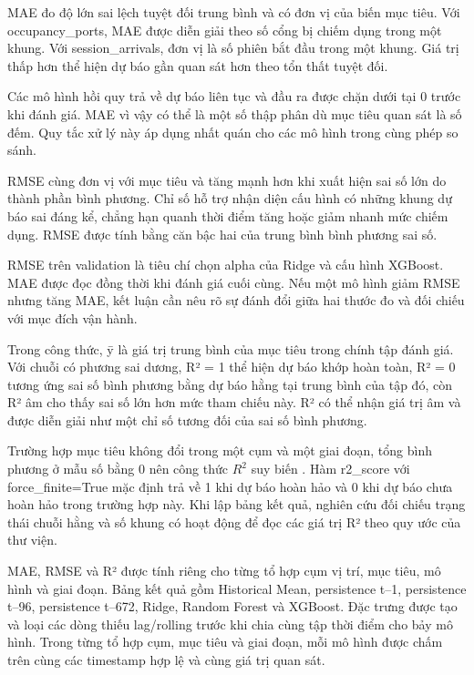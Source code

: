 \documentclass[conference,a4paper]{IEEEtran}
\begin{document}
MAE đo độ lớn sai lệch tuyệt đối trung bình và có đơn vị của biến mục tiêu. Với occupancy\_ports, MAE được diễn giải theo số cổng bị chiếm dụng trong một khung. Với session\_arrivals, đơn vị là số phiên bắt đầu trong một khung. Giá trị thấp hơn thể hiện dự báo gần quan sát hơn theo tổn thất tuyệt đối.

Các mô hình hồi quy trả về dự báo liên tục và đầu ra được chặn dưới tại 0 trước khi đánh giá. MAE vì vậy có thể là một số thập phân dù mục tiêu quan sát là số đếm. Quy tắc xử lý này áp dụng nhất quán cho các mô hình trong cùng phép so sánh.

RMSE cùng đơn vị với mục tiêu và tăng mạnh hơn khi xuất hiện sai số lớn do thành phần bình phương. Chỉ số hỗ trợ nhận diện cấu hình có những khung dự báo sai đáng kể, chẳng hạn quanh thời điểm tăng hoặc giảm nhanh mức chiếm dụng. RMSE được tính bằng căn bậc hai của trung bình bình phương sai số.

RMSE trên validation là tiêu chí chọn alpha của Ridge và cấu hình XGBoost. MAE được đọc đồng thời khi đánh giá cuối cùng. Nếu một mô hình giảm RMSE nhưng tăng MAE, kết luận cần nêu rõ sự đánh đổi giữa hai thước đo và đối chiếu với mục đích vận hành.

Trong công thức, ȳ là giá trị trung bình của mục tiêu trong chính tập đánh giá. Với chuỗi có phương sai dương, R² = 1 thể hiện dự báo khớp hoàn toàn, R² = 0 tương ứng sai số bình phương bằng dự báo hằng tại trung bình của tập đó, còn R² âm cho thấy sai số lớn hơn mức tham chiếu này. R² có thể nhận giá trị âm và được diễn giải như một chỉ số tương đối của sai số bình phương.

Trường hợp mục tiêu không đổi trong một cụm và một giai đoạn, tổng bình phương ở mẫu số bằng 0 nên công thức $R^2$ suy biến \cite{sklearnr2}. Hàm r2\_score với force\_finite=True mặc định trả về 1 khi dự báo hoàn hảo và 0 khi dự báo chưa hoàn hảo trong trường hợp này. Khi lập bảng kết quả, nghiên cứu đối chiếu trạng thái chuỗi hằng và số khung có hoạt động để đọc các giá trị R² theo quy ước của thư viện.

MAE, RMSE và R² được tính riêng cho từng tổ hợp cụm vị trí, mục tiêu, mô hình và giai đoạn. Bảng kết quả gồm Historical Mean, persistence t–1, persistence t–96, persistence t–672, Ridge, Random Forest và XGBoost. Đặc trưng được tạo và loại các dòng thiếu lag/rolling trước khi chia cùng tập thời điểm cho bảy mô hình. Trong từng tổ hợp cụm, mục tiêu và giai đoạn, mỗi mô hình được chấm trên cùng các timestamp hợp lệ và cùng giá trị quan sát.
\end{document}
